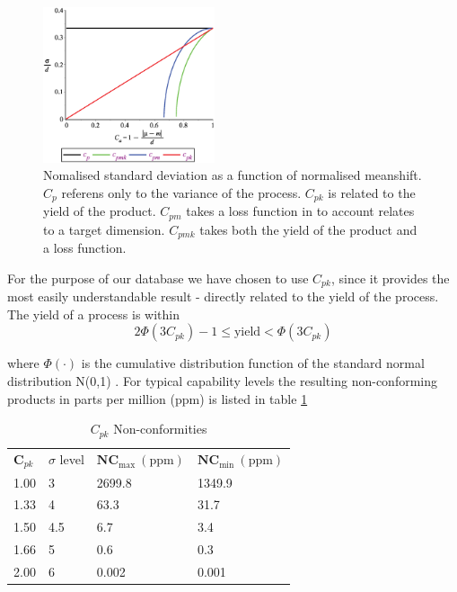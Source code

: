 \documentclass[aip,amsmath, preprint, author-year]{revtex4-1}
\begin{document}
\begin{figure}
\includegraphics[width=0.45\textwidth]{graph_postscript_test.eps}
\caption{\label{fig:CPI} Nomalised standard deviation as a function of normalised meanshift. $C_p$ referens only to the variance of the process. 
$C_{pk}$ is related to the yield of the product. $C_{pm}$ takes a loss function in to account relates to a target dimension. 
$C_{pmk}$ takes both the yield of the product and a loss function. }
\end{figure}

For the purpose of our database we have chosen to use $C_{pk}$, since it provides the most easily understandable result - directly related to the yield of the process. The yield of a process is within
\begin{equation}
	2\Phi(3C_{pk})-1 \leq \text{yield} < \Phi(3C_{pk}) \nonumber
\end{equation}

where $\Phi(\cdot)$ is the cumulative distribution function of the standard normal distribution N(0,1) \citep{boyles1991taguchi}. 
For typical capability levels the resulting non-conforming products in parts per million (ppm) is listed in table \ref{tab:cpl_nc}

\begin{table}
\begin{ruledtabular}
\caption{\label{tab:cpl_nc} $C_{pk}$ Non-conformities}
\begin{tabular}{llll}
  $\mathbf{C}_{pk}$	& $\sigma$ level	& $\mathbf{NC_\mathrm{max}} \mathrm{\ (ppm)}$	&  $\mathbf{NC_\mathrm{min}} \mathrm{\ (ppm)}$	\\
  1.00	& 3		& 2699.8		& 1349.9		\\
  1.33 	& 4 		& 63.3		& 31.7 		\\
  1.50 	& 4.5 	& 6.7		& 3.4		\\
  1.66	& 5		& 0.6		& 0.3		\\
  2.00	& 6		& 0.002		& 0.001		\\
\end{tabular}%
\end{ruledtabular}
\end{table}
\end{document}
